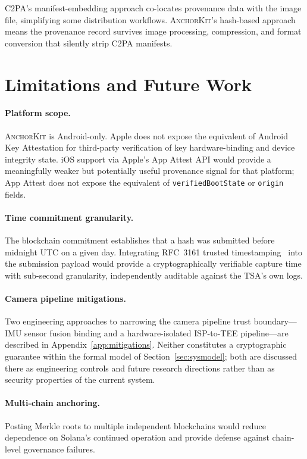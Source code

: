 \documentclass[11pt,a4paper]{article}
\newcommand{\AK}{\textsc{AnchorKit}\xspace}
\begin{document}
C2PA's manifest-embedding approach co-locates provenance data with the image
file, simplifying some distribution workflows.  \AK's hash-based approach means
the provenance record survives image processing, compression, and format
conversion that silently strip C2PA manifests.

\section{Limitations and Future Work}
\label{sec:limitations}

\paragraph{Platform scope.} \AK is Android-only.  Apple does not expose the
equivalent of Android Key Attestation for third-party verification of key
hardware-binding and device integrity state.  iOS support via Apple's App Attest
API would provide a meaningfully weaker but potentially useful provenance signal
for that platform; App Attest does not expose the equivalent of
\texttt{verifiedBootState} or \texttt{origin} fields.

\paragraph{Time commitment granularity.} The blockchain commitment establishes
that a hash was submitted before midnight UTC on a given day.  Integrating
RFC~3161 trusted timestamping~\cite{rfc3161} into the submission payload would
provide a cryptographically verifiable capture time with sub-second granularity,
independently auditable against the TSA's own logs.

\paragraph{Camera pipeline mitigations.} Two engineering approaches to
narrowing the camera pipeline trust boundary---IMU sensor fusion binding and a
hardware-isolated ISP-to-TEE pipeline---are described in
Appendix~\ref{app:mitigations}.  Neither constitutes a cryptographic guarantee
within the formal model of Section~\ref{sec:sysmodel}; both are discussed there
as engineering controls and future research directions rather than as security
properties of the current system.

\paragraph{Multi-chain anchoring.} Posting Merkle roots to multiple independent
blockchains would reduce dependence on Solana's continued operation and provide
defense against chain-level governance failures.
\end{document}
